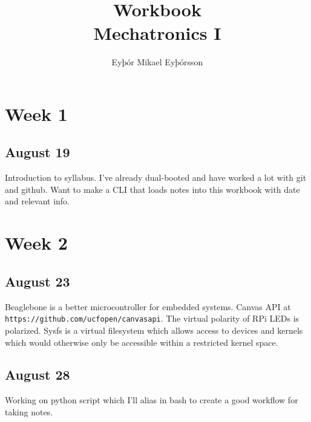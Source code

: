 \documentclass{article}
\title{Workbook\\Mechatronics I}
\author{Eyþór Mikael Eyþórsson}
\begin{document}
\maketitle
\section*{Week 1}
\subsection*{August 19}
Introduction to syllabus. 
I've already dual-booted and have worked a lot with git and github. 
Want to make a CLI that loads notes into this workbook with date and relevant info.
\section*{Week 2}
\subsection*{August 23}
Beaglebone is a better microcontroller for embedded systems.
Canvas API at \texttt{https://github.com/ucfopen/canvasapi}.
The virtual polarity of RPi LEDs is polarized.
Sysfs is a virtual filesystem which allows access to devices and kernels which would otherwise 
only be accessible within a restricted kernel space.
\subsection*{August 28}
Working on python script which I'll alias in bash to create a good workflow for taking notes.
\end{document}
